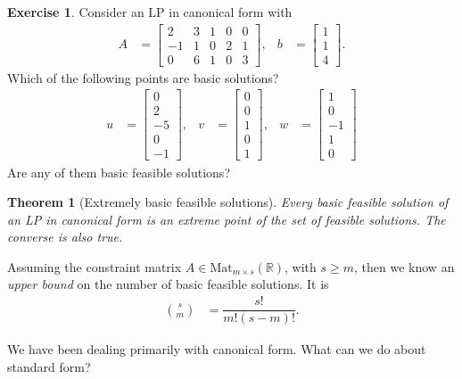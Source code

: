 \documentclass[a4paper, 12pt]{article}
\numberwithin{equation}{section}
\numberwithin{figure}{section}
\newtheorem{thm}{Theorem}[section]
\theoremstyle{definition}
\newtheorem{exercise}{Exercise}
\renewcommand{\geq}{\geqslant}
\newcommand{\R}{\mathbb{R}}
\begin{document}
\begin{exercise}
	Consider an LP in canonical form with 
	\begin{align*}
		A &= \begin{bmatrix}
			2 & 3 & 1 & 0 & 0 \\ 
			-1 & 1 & 0 & 2 & 1 \\
			0 & 6 & 1 & 0 & 3 
		\end{bmatrix}, & b &= \begin{bmatrix}
			1 \\ 1 \\ 4
		\end{bmatrix}.
	\end{align*}
	Which of the following points are basic solutions?
	\begin{align*}
		u &= \begin{bmatrix}
			0 \\ 2 \\ -5 \\ 0 \\ -1 
		\end{bmatrix}, & v &= \begin{bmatrix}
			0 \\ 0 \\ 1 \\0 \\ 1
		\end{bmatrix}, & w &= \begin{bmatrix}
			1 \\ 0 \\ -1 \\ 1 \\ 0
		\end{bmatrix}
	\end{align*}
	Are any of them basic feasible solutions?
\end{exercise}

\begin{thm}[Extremely basic feasible solutions]
	Every basic feasible solution of an LP in canonical form is an extreme point
	of the set of feasible solutions. The converse is also true.
\end{thm}

Assuming the constraint matrix $A\in\mathrm{Mat}_{m\times s}(\R)$, with $s\geq
m$, then we know an \emph{upper bound} on the number of basic feasible
solutions. It is 
\begin{align*}
	\binom{s}{m} &= \dfrac{s!}{m!(s-m)!} .
\end{align*}

We have been dealing primarily with canonical form. What can we do about standard form?
\end{document}
